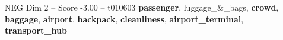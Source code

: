 \begin{textsample}{NEG Dim 2 – Score -3.00 – t010603}  \label{ex:f2_neg_019}
\textbf{passenger}, luggage\_\&\_bags, \textbf{crowd}, \textbf{baggage}, \textbf{airport}, \textbf{backpack}, \textbf{cleanliness}, \textbf{airport\_terminal}, \textbf{transport\_hub}

\end{textsample}
